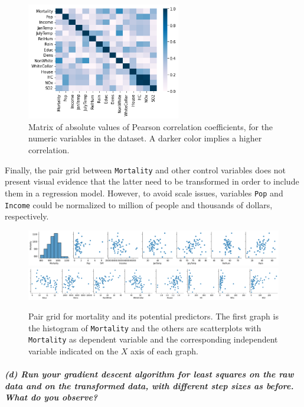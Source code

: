 \documentclass[11pt, english]{article}
\begin{document}
\begin{figure}[H]
	\centering
	\includegraphics[width=0.6\textwidth]{correlMatrix}
	\caption{Matrix of absolute values of Pearson correlation coefficients, for the numeric variables in the dataset. A darker color implies a higher correlation.}
\end{figure}


Finally, the pair grid between \texttt{Mortality} and other control
variables does not present visual evidence that the latter need to be
transformed in order to include them in a regression model. However, to
avoid scale issues, variables \texttt{Pop} and \texttt{Income} could be
normalized to million of people and thousands of dollars, respectively.

\begin{figure}[H]
	\centering
	\includegraphics[width=\textwidth]{pairGrid1}
	\includegraphics[width=\textwidth]{pairGrid2}	
	\caption{Pair grid for mortality and its potential predictors. The first graph is the histogram of \texttt{Mortality} and the others are scatterplots with \texttt{Mortality} as dependent variable and the corresponding independent variable indicated on the $X$ axis of each graph.}
\end{figure}


    
    \hypertarget{d-run-your-gradient-descent-algorithm-for-least-squares-on-the-raw-data-and-on-the-transformed-data-with-different-step-sizes-as-before.-what-do-you-observe}{%
\subparagraph{(d) Run your gradient descent algorithm for least squares
on the raw data and on the transformed data, with different step sizes
as before. What do you
observe?\\[2ex]}\label{d-run-your-gradient-descent-algorithm-for-least-squares-on-the-raw-data-and-on-the-transformed-data-with-different-step-sizes-as-before.-what-do-you-observe}}
\end{document}
